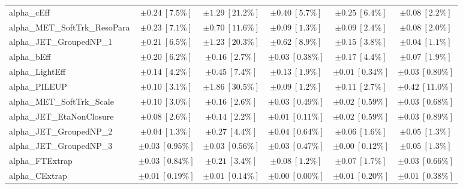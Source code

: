 \begin{sidewaystable}
\begin{center}
\begin{tabular*}{\textwidth}{@{\extracolsep{\fill}}lccccc}
alpha\_cEff         & $\pm 0.24\ [7.5\%] $          & $\pm 1.29\ [21.2\%] $          & $\pm 0.40\ [5.7\%] $          & $\pm 0.25\ [6.4\%] $          & $\pm 0.08\ [2.2\%] $       \\
alpha\_MET\_SoftTrk\_ResoPara         & $\pm 0.23\ [7.1\%] $          & $\pm 0.70\ [11.6\%] $          & $\pm 0.09\ [1.3\%] $          & $\pm 0.09\ [2.4\%] $          & $\pm 0.08\ [2.0\%] $       \\
alpha\_JET\_GroupedNP\_1         & $\pm 0.21\ [6.5\%] $          & $\pm 1.23\ [20.3\%] $          & $\pm 0.62\ [8.9\%] $          & $\pm 0.15\ [3.8\%] $          & $\pm 0.04\ [1.1\%] $       \\
alpha\_bEff         & $\pm 0.20\ [6.2\%] $          & $\pm 0.16\ [2.7\%] $          & $\pm 0.03\ [0.38\%] $          & $\pm 0.17\ [4.4\%] $          & $\pm 0.07\ [1.9\%] $       \\
alpha\_LightEff         & $\pm 0.14\ [4.2\%] $          & $\pm 0.45\ [7.4\%] $          & $\pm 0.13\ [1.9\%] $          & $\pm 0.01\ [0.34\%] $          & $\pm 0.03\ [0.80\%] $       \\
alpha\_PILEUP         & $\pm 0.10\ [3.1\%] $          & $\pm 1.86\ [30.5\%] $          & $\pm 0.09\ [1.2\%] $          & $\pm 0.11\ [2.7\%] $          & $\pm 0.42\ [11.0\%] $       \\
alpha\_MET\_SoftTrk\_Scale         & $\pm 0.10\ [3.0\%] $          & $\pm 0.16\ [2.6\%] $          & $\pm 0.03\ [0.49\%] $          & $\pm 0.02\ [0.59\%] $          & $\pm 0.03\ [0.68\%] $       \\
alpha\_JET\_EtaNonClosure         & $\pm 0.08\ [2.6\%] $          & $\pm 0.14\ [2.2\%] $          & $\pm 0.01\ [0.11\%] $          & $\pm 0.02\ [0.59\%] $          & $\pm 0.03\ [0.89\%] $       \\
alpha\_JET\_GroupedNP\_2         & $\pm 0.04\ [1.3\%] $          & $\pm 0.27\ [4.4\%] $          & $\pm 0.04\ [0.64\%] $          & $\pm 0.06\ [1.6\%] $          & $\pm 0.05\ [1.3\%] $       \\
alpha\_JET\_GroupedNP\_3         & $\pm 0.03\ [0.95\%] $          & $\pm 0.03\ [0.56\%] $          & $\pm 0.03\ [0.47\%] $          & $\pm 0.00\ [0.12\%] $          & $\pm 0.05\ [1.3\%] $       \\
alpha\_FTExtrap         & $\pm 0.03\ [0.84\%] $          & $\pm 0.21\ [3.4\%] $          & $\pm 0.08\ [1.2\%] $          & $\pm 0.07\ [1.7\%] $          & $\pm 0.03\ [0.66\%] $       \\
alpha\_CExtrap         & $\pm 0.01\ [0.19\%] $          & $\pm 0.01\ [0.14\%] $          & $\pm 0.00\ [0.00\%] $          & $\pm 0.01\ [0.20\%] $          & $\pm 0.01\ [0.38\%] $       \\

\end{tabular*}
\end{center}
\end{sidewaystable}
